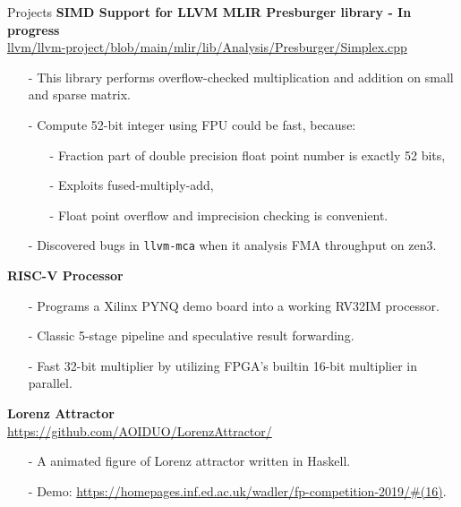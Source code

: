\documentclass{resume} %
\newcommand{\itemsepval}{-6pt}
\begin{document}
\begin{rSection}{Projects}
    \textbf{SIMD Support for LLVM MLIR Presburger library - In progress} \hfill \\
    \url{llvm/llvm-project/blob/main/mlir/lib/Analysis/Presburger/Simplex.cpp} \hfill \par
    \begin{itemize}
        \itemsep \itemsepval {} 
        \item[-] This library performs overflow-checked multiplication and addition on small and sparse matrix. 
        \item[-] Compute 52-bit integer using FPU could be fast, because: 
        \begin{itemize}
            \itemsep \itemsepval {} 
            \item[-] Fraction part of double precision float point number is exactly 52 bits,
            \item[-] Exploits fused-multiply-add,
            \item[-] Float point overflow and imprecision checking is convenient.
        \end{itemize}
    \item[-] Discovered bugs in \texttt{llvm-mca} when it analysis FMA throughput on zen3. 
    \end{itemize}

    \textbf{RISC-V Processor} \par
    \begin{itemize}
        \itemsep \itemsepval {} 
        \item[-] Programs a Xilinx PYNQ demo board into a working RV32IM processor.
        \item[-] Classic 5-stage pipeline and speculative result forwarding.
        \item[-] Fast 32-bit multiplier by utilizing FPGA's builtin 16-bit multiplier in parallel.
    \end{itemize}
    
    \textbf{Lorenz Attractor} \hfill \\
    \url{https://github.com/AOIDUO/LorenzAttractor/} \hfill \par
    \begin{itemize}
        \itemsep \itemsepval {} 
        \item[-] A animated figure of Lorenz attractor written in Haskell.
        \item[-] Demo: \url{https://homepages.inf.ed.ac.uk/wadler/fp-competition-2019/#(16)}.
    \end{itemize}


\end{rSection}
\end{document}
